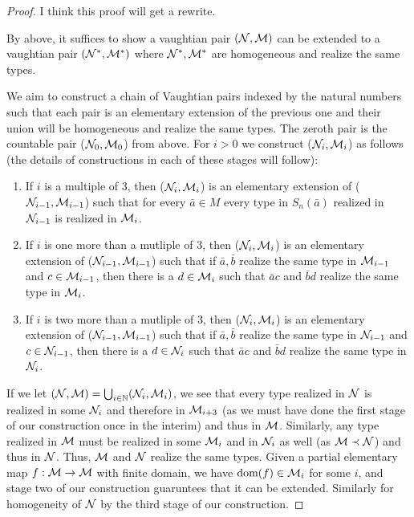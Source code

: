 \begin{proof}

{\color{red} I think this proof will get a rewrite.}

By above, it suffices to show a vaughtian pair \((\mathcal{N}, \mathcal{M})\) can be extended to a vaughtian pair \((\mathcal{N}^*, \mathcal{M}^*)\) where \(\mathcal{N}^*, \mathcal{M}^*\) are homogeneous and realize the same types. 

We aim to construct a chain of Vaughtian pairs indexed by the natural numbers such that each pair is an elementary extension of the previous one and their union will be homogeneous and realize the same types. 
The zeroth pair is the countable pair (\(\mathcal{N}_0, \mathcal{M}_0\)) from above. 
For \(i > 0\) we construct (\(\mathcal{N}_i, \mathcal{M}_i\)) as follows (the details of constructions in each of these stages will follow):

\begin{enumerate}

  \item  If \(i\) is a multiple of 3, then (\(\mathcal{N}_i, \mathcal{M}_i\)) is an elementary extension of (\(\mathcal{N}_{i-1}, \mathcal{M}_{i-1}\)) such that for every \(\bar{a} \in M\) every type in \(S_n(\bar{a})\) realized in \(\mathcal{N}_{i-1}\) is realized in \(\mathcal{M}_i\). %

  \item  If \(i\) is one more than a mutliple of 3, then (\(\mathcal{N}_i, \mathcal{M}_i\)) is an elementary extension of (\(\mathcal{N}_{i-1}, \mathcal{M}_{i-1}\)) such that if \(\bar{a}, \bar{b}\) realize the same type in \(\mathcal{M}_{i-1}\) and \(c \in \mathcal{M}_{i-1}\), then there is a \(d \in \mathcal{M}_i\) such that \(\bar{a}c\) and \(\bar{b}d\) realize the same type in \(\mathcal{M}_i\). 

  \item If \(i\) is two more than a mutliple of 3, then (\(\mathcal{N}_i, \mathcal{M}_i\)) is an elementary extension of (\(\mathcal{N}_{i-1}, \mathcal{M}_{i-1}\)) such that if \(\bar{a}, \bar{b}\) realize the same type in \(\mathcal{N}_{i-1}\) and \(c \in \mathcal{N}_{i-1}\), then there is a \(d \in \mathcal{N}_i\) such that \(\bar{a}c\) and \(\bar{b}d\) realize the same type in \(\mathcal{N}_i\).

\end{enumerate}

If we let \((\mathcal{N}, \mathcal{M}) = \bigcup_{i \in \mathbb{N}}(\mathcal{N}_i, \mathcal{M}_i)\), we see that every type realized in \(\mathcal{N}\) is realized in some \(\mathcal{N}_i\) and therefore in \(\mathcal{M}_{i+3}\) (as we must have done the first stage of our construction once in the interim) and thus in \(\mathcal{M}\). 
Similarly, any type realized in \(\mathcal{M}\) must be realized in some \(\mathcal{M}_i\) and in \(\mathcal{N}_i\) as well (as \(\mathcal{M} \prec \mathcal{N}\)) and thus in \(\mathcal{N}\).
Thus, \(\mathcal{M}\) and  \(\mathcal{N}\) realize the same types.  
Given a partial elementary map \(f:\mathcal{M} \to \mathcal{M}\) with finite domain, we have \(\text{dom}(f) \in \mathcal{M}_i\) for some \(i\), and stage two of our construction guaruntees that it can be extended. 
Similarly for homogeneity of \(\mathcal{N}\) by the third stage of our construction. 


\end{proof}

